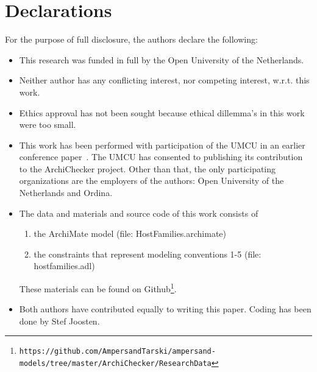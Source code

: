\documentclass[sn-vancouver]{sn-jnl}%
\begin{document}
\backmatter


\section*{Declarations}
For the purpose of full disclosure, the authors declare the following:

\begin{itemize}
\item This research was funded in full by the Open University of the Netherlands.
\item Neither author has any conflicting interest, nor competing interest, w.r.t. this work.
\item Ethics approval has not been sought because ethical dillemma's in this work were too small.
\item This work has been performed with participation of the UMCU in an earlier conference paper~\cite{iceis22}.
The UMCU has consented to publishing its contribution to the ArchiChecker project.
Other than that, the only participating organizations are the employers of the authors: Open University of the Netherlands and Ordina.
\item The data and materials and source code of this work consists of
\begin{enumerate}
   \item the ArchiMate model (file: HostFamilies.archimate)
   \item the constraints that represent modeling conventions 1-5 (file: hostfamilies.adl)
\end{enumerate}
These materials can be found on Github\footnote{\tt\tiny https://github.com/AmpersandTarski/ampersand-models/tree/master/ArchiChecker/ResearchData}.
\item Both authors have contributed equally to writing this paper. Coding has been done by Stef Joosten.
\end{itemize}





\end{document}
